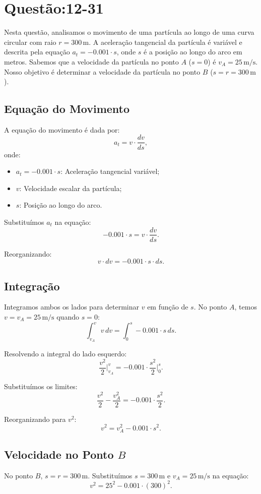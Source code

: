 \section{Questão:12-31}

Nesta questão, analisamos o movimento de uma partícula ao longo de uma curva circular com raio \(r = 300 \, \text{m}\). A aceleração tangencial da partícula é variável e descrita pela equação \(a_t = -0.001 \cdot s\), onde \(s\) é a posição ao longo do arco em metros. Sabemos que a velocidade da partícula no ponto \(A\) (\(s = 0\)) é \(v_A = 25 \, \text{m/s}\). Nosso objetivo é determinar a velocidade da partícula no ponto \(B\) (\(s = r = 300 \, \text{m}\)).

\subsection*{Equação do Movimento}
A equação do movimento é dada por:
\[
a_t = v \cdot \frac{dv}{ds},
\]
onde:
\begin{itemize}
    \item \(a_t = -0.001 \cdot s\): Aceleração tangencial variável;
    \item \(v\): Velocidade escalar da partícula;
    \item \(s\): Posição ao longo do arco.
\end{itemize}

Substituímos \(a_t\) na equação:
\[
-0.001 \cdot s = v \cdot \frac{dv}{ds}.
\]

Reorganizando:
\[
v \cdot dv = -0.001 \cdot s \cdot ds.
\]

\subsection*{Integração}
Integramos ambos os lados para determinar \(v\) em função de \(s\). No ponto \(A\), temos \(v = v_A = 25 \, \text{m/s}\) quando \(s = 0\):
\[
\int_{v_A}^{v} v \, dv = \int_{0}^{s} -0.001 \cdot s \, ds.
\]

Resolvendo a integral do lado esquerdo:
\[
\frac{v^2}{2} \bigg|_{v_A}^{v} = -0.001 \cdot \frac{s^2}{2} \bigg|_{0}^{s}.
\]

Substituímos os limites:
\[
\frac{v^2}{2} - \frac{v_A^2}{2} = -0.001 \cdot \frac{s^2}{2}.
\]

Reorganizando para \(v^2\):
\[
v^2 = v_A^2 - 0.001 \cdot s^2.
\]

\subsection*{Velocidade no Ponto \(B\)}
No ponto \(B\), \(s = r = 300 \, \text{m}\). Substituímos \(s = 300 \, \text{m}\) e \(v_A = 25 \, \text{m/s}\) na equação:
\[
v^2 = 25^2 - 0.001 \cdot (300)^2.
\]

